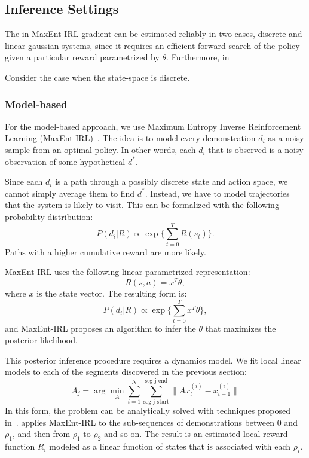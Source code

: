 \subsection{Inference Settings}
The in MaxEnt-IRL gradient can be estimated reliably in two cases, discrete and linear-gaussian systems, since it requires an efficient forward search of the policy given a particular reward parametrized by $\theta$.
Furthermore, in

Consider the case when the state-space is discrete.







\subsubsection{Model-based}
For the model-based approach, we use Maximum Entropy Inverse Reinforcement Learning (MaxEnt-IRL)~\cite{DBLP:conf/aaai/ZiebartMBD08}. 
The idea is to model every demonstration $d_i$ as a noisy sample from an optimal policy.
In other words, each $d_i$ that is observed is a noisy observation of some hypothetical $d^*$.

Since each $d_i$ is a path through a possibly discrete state and action space, we cannot simply average them to find $d^*$.
Instead, we have to model trajectories that the system is likely to visit. 
This can be formalized with the following probability distribution:
\[
P(d_i | R) \propto \exp \{ \sum_{t=0}^T R(s_t) \}.
\]
Paths with a higher cumulative reward are more likely.

MaxEnt-IRL uses the following linear parametrized representation:
\[
R(s,a) = x^T \theta,
\]
where $x$ is the state vector. The resulting form is:
\[
P(d_i | R) \propto \exp \{ \sum_{t=0}^T x^T \theta \},
\]
and MaxEnt-IRL proposes an algorithm to infer the $\theta$ that maximizes the posterior likelihood.



This posterior inference procedure requires a dynamics model. We fit local linear models to each of the segments discovered in the previous section:
\[
A_j = \arg\min_{A} \sum_{i=1}^N \sum_{\text{seg j start}}^{\text{seg j end}} \|A x^{(i)}_{t} - x^{(i)}_{t+1}\|
\]
In this form, the problem can be analytically solved with techniques proposed in~\cite{ziebart2012probabilistic}.
\hirl applies MaxEnt-IRL to the sub-sequences of demonstrations between 0 and $\rho_1$, and then from $\rho_1$ to $\rho_2$ and so on.
The result is an estimated local reward function $R_{i}$ modeled as a linear function of states that is associated with each $\rho_i$.

